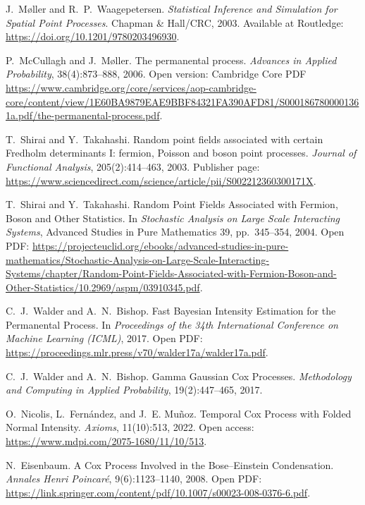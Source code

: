\documentclass[11pt]{article}
\begin{document}

\begin{thebibliography}{10}
	
	J.~M{\o}ller and R.~P.~Waagepetersen.
	\newblock \emph{Statistical Inference and Simulation for Spatial Point Processes}.
	\newblock Chapman \& Hall/CRC, 2003.
	Available at Routledge: \url{https://doi.org/10.1201/9780203496930}.
	
	P.~McCullagh and J.~M{\o}ller.
	\newblock The permanental process.
	\newblock \emph{Advances in Applied Probability}, 38(4):873--888, 2006.
	Open version: Cambridge Core PDF \url{https://www.cambridge.org/core/services/aop-cambridge-core/content/view/1E60BA9879EAE9BBF84321FA390AFD81/S0001867800001361a.pdf/the-permanental-process.pdf}.
	
	T.~Shirai and Y.~Takahashi.
	\newblock Random point fields associated with certain Fredholm determinants I: fermion, Poisson and boson point processes.
	\newblock \emph{Journal of Functional Analysis}, 205(2):414--463, 2003.
	Publisher page: \url{https://www.sciencedirect.com/science/article/pii/S002212360300171X}.
	
	T.~Shirai and Y.~Takahashi.
	\newblock Random Point Fields Associated with Fermion, Boson and Other Statistics.
	\newblock In \emph{Stochastic Analysis on Large Scale Interacting Systems}, Advanced Studies in Pure Mathematics 39, pp.~345--354, 2004.
	Open PDF: \url{https://projecteuclid.org/ebooks/advanced-studies-in-pure-mathematics/Stochastic-Analysis-on-Large-Scale-Interacting-Systems/chapter/Random-Point-Fields-Associated-with-Fermion-Boson-and-Other-Statistics/10.2969/aspm/03910345.pdf}.
	
	C.~J.~Walder and A.~N.~Bishop.
	\newblock Fast Bayesian Intensity Estimation for the Permanental Process.
	\newblock In \emph{Proceedings of the 34th International Conference on Machine Learning (ICML)}, 2017.
	Open PDF: \url{https://proceedings.mlr.press/v70/walder17a/walder17a.pdf}.
	
	C.~J.~Walder and A.~N.~Bishop.
	\newblock Gamma Gaussian Cox Processes.
	\newblock \emph{Methodology and Computing in Applied Probability}, 19(2):447--465, 2017.
	
	O.~Nicolis, L.~Fernández, and J.~E. Muñoz.
	\newblock Temporal Cox Process with Folded Normal Intensity.
	\newblock \emph{Axioms}, 11(10):513, 2022.
	Open access: \url{https://www.mdpi.com/2075-1680/11/10/513}.
	
	N.~Eisenbaum.
	\newblock A Cox Process Involved in the Bose--Einstein Condensation.
	\newblock \emph{Annales Henri Poincaré}, 9(6):1123--1140, 2008.
	Open PDF: \url{https://link.springer.com/content/pdf/10.1007/s00023-008-0376-6.pdf}.
	
\end{thebibliography}
\end{document}
